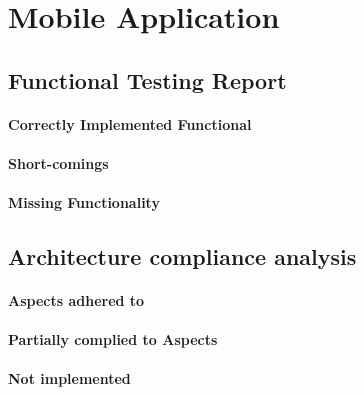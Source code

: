 \documentclass[10pt]{article}
\begin{document}
\author{Emilio Singh, Matthew Botha, Gerard van Wyk}
\section{Mobile Application}
\subsection{Functional Testing Report}

\paragraph{Correctly Implemented Functional}
\paragraph{Short-comings}
\paragraph{Missing Functionality}

\subsection{Architecture compliance analysis}

\paragraph{Aspects adhered to}
\paragraph{Partially complied to Aspects}
\paragraph{Not implemented}
\end{document}
